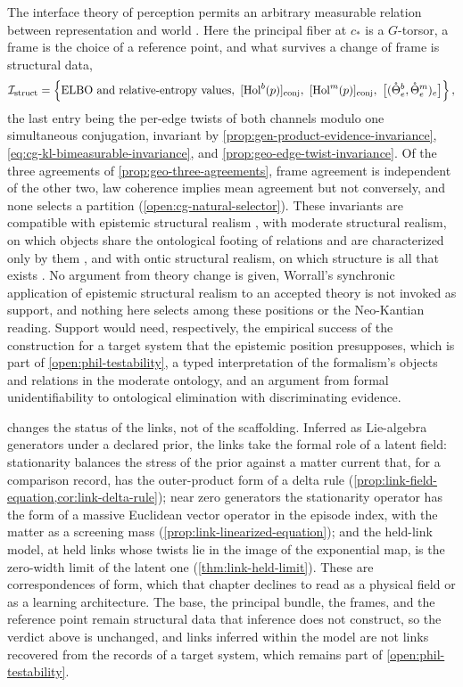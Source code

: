 The interface theory of perception permits an arbitrary measurable relation
between representation and world \citep{Hoffman2015,Hoffman2019}. Here the
principal fiber at \(c_*\) is a \(G\)-torsor, a frame is the choice of a
reference point, and what survives a change of frame is structural data,
\begin{equation}
\mathcal I_{\mathrm{struct}}
=\left\{
\text{ELBO and relative-entropy values},\
[\mathrm{Hol}^b(p)]_{\rm conj},\
[\mathrm{Hol}^m(p)]_{\rm conj},\
\bigl[(\mathring\Theta^b_e,\mathring\Theta^m_e)_{e}\bigr]
\right\},
\label{eq:phil-invariants}
\end{equation}
the last entry being the per-edge twists of both channels modulo one
simultaneous conjugation, invariant by
\cref{prop:gen-product-evidence-invariance},
\eqref{eq:cg-kl-bimeasurable-invariance}, and
\cref{prop:geo-edge-twist-invariance}. Of the three agreements of
\cref{prop:geo-three-agreements}, frame agreement is independent of the other
two, law coherence implies mean agreement but not conversely, and none selects a
partition (\cref{open:cg-natural-selector}). These invariants are compatible
with epistemic structural realism \citep{Worrall1989}, with moderate structural
realism, on which objects share the ontological footing of relations and are
characterized only by them \citep{esfeld2008moderate}, and with ontic structural
realism, on which structure is all that exists \citep{Ladyman2007,Ladyman2014}.
No argument from theory change is given, Worrall's synchronic application of
epistemic structural realism to an accepted theory is not invoked as support,
and nothing here selects among these positions or the Neo-Kantian
reading. Support would need, respectively, the empirical success of the
construction for a target system that the epistemic position presupposes,
which is part of \cref{open:phil-testability}, a typed interpretation of the formalism's objects and
relations in the moderate ontology, and an argument from formal
unidentifiability to ontological elimination with discriminating evidence.

\Cref{ch:links} changes the status of the links, not of the scaffolding. Inferred as Lie-algebra
generators under a declared prior, the links take the formal role of a latent field: stationarity
balances the stress of the prior against a matter current that, for a comparison record, has the
outer-product form of a delta rule (\cref{prop:link-field-equation,cor:link-delta-rule}); near zero
generators the stationarity operator has the form of a massive Euclidean vector operator in the episode
index, with the matter as a screening mass (\cref{prop:link-linearized-equation}); and the held-link
model, at held links whose twists lie in the image of the exponential map, is the zero-width limit of
the latent one (\cref{thm:link-held-limit}). These are correspondences
of form, which that chapter declines to read as a physical field or as a learning architecture. The base,
the principal bundle, the frames, and the reference point remain structural data that inference does not
construct, so the verdict above is unchanged, and links inferred within the model are not links
recovered from the records of a target system, which remains part of \cref{open:phil-testability}.

